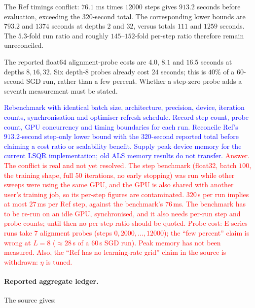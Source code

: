 \documentclass{article}
\newcommand{\zied}[1]{\textcolor{blue}{#1}}
\newcommand{\nat}[1]{\textcolor{red}{#1}}
\theoremstyle{definition}
\theoremstyle{remark}
\begin{document}
The Ref timings conflict: $76.1$ ms times $12000$ steps gives $913.2$ seconds before evaluation, exceeding the $320$-second total. The corresponding lower bounds are $793.2$ and $1374$ seconds at depths $2$ and $32$, versus totals $111$ and $1259$ seconds. The $5.3$-fold run ratio and roughly $145$--$152$-fold per-step ratio therefore remain unreconciled.

The reported float64 alignment-probe costs are $4.0$, $8.1$ and $16.5$ seconds at depths $8,16,32$. Six depth-$8$ probes already cost $24$ seconds; this is $40\%$ of a $60$-second SGD run, rather than a few percent. Whether a step-zero probe adds a seventh measurement must be stated.

\zied{Rebenchmark with identical batch size, architecture, precision, device, iteration counts, synchronisation and optimiser-refresh schedule. Record step count, probe count, GPU concurrency and timing boundaries for each run. Reconcile Ref's $913.2$-second step-only lower bound with the $320$-second reported total before claiming a cost ratio or scalability benefit. Supply peak device memory for the current LSQR implementation; old ALS memory results do not transfer.}
\nat{Answer. The conflict is real and not yet resolved. The step benchmark (float32, batch $100$, the training shape, full $50$ iterations, no early stopping) was run while other sweeps were using the same GPU, and the GPU is also shared with another user's training job, so its per-step figures are contaminated. $320$\,s per run implies at most $27$\,ms per Ref step, against the benchmark's $76$\,ms. The benchmark has to be re-run on an idle GPU, synchronised, and it also needs per-run step and probe counts; until then no per-step ratio should be quoted. Probe cost: E-series runs take $7$ alignment probes (steps $0,2000,\dots,12000$); the ``few percent'' claim is wrong at $L=8$ ($\approx28$\,s of a $60$\,s SGD run). Peak memory has not been measured. Also, the ``Ref has no learning-rate grid'' claim in the source is withdrawn: $\eta$ is tuned.}

\paragraph{Reported aggregate ledger.}
The source gives:
\end{document}
